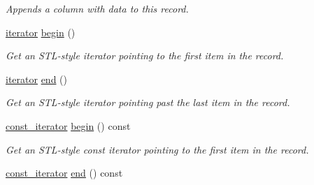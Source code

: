 \begin{DoxyCompactItemize}
\begin{DoxyCompactList}\small\item\em Appends a column with {\itshape data} to this record. \end{DoxyCompactList}\item 
\hyperlink{class_mdt_1_1_plain_text_1_1_record_template_a0785bfc19bfa479d1097dbfcfdd03bef}{iterator} \hyperlink{class_mdt_1_1_plain_text_1_1_record_template_a9dd45947652ce2969f4a8c3b98e852bc}{begin} ()\hypertarget{class_mdt_1_1_plain_text_1_1_record_template_a9dd45947652ce2969f4a8c3b98e852bc}{}\label{class_mdt_1_1_plain_text_1_1_record_template_a9dd45947652ce2969f4a8c3b98e852bc}

\begin{DoxyCompactList}\small\item\em Get an S\+T\+L-\/style iterator pointing to the first item in the record. \end{DoxyCompactList}\item 
\hyperlink{class_mdt_1_1_plain_text_1_1_record_template_a0785bfc19bfa479d1097dbfcfdd03bef}{iterator} \hyperlink{class_mdt_1_1_plain_text_1_1_record_template_af87a170a35d825212480b33c2470f4c2}{end} ()\hypertarget{class_mdt_1_1_plain_text_1_1_record_template_af87a170a35d825212480b33c2470f4c2}{}\label{class_mdt_1_1_plain_text_1_1_record_template_af87a170a35d825212480b33c2470f4c2}

\begin{DoxyCompactList}\small\item\em Get an S\+T\+L-\/style iterator pointing past the last item in the record. \end{DoxyCompactList}\item 
\hyperlink{class_mdt_1_1_plain_text_1_1_record_template_a3c5cf577c8412857077b2a1f9088c1ae}{const\+\_\+iterator} \hyperlink{class_mdt_1_1_plain_text_1_1_record_template_a49e047841c96985dfd966190c29d5a1c}{begin} () const \hypertarget{class_mdt_1_1_plain_text_1_1_record_template_a49e047841c96985dfd966190c29d5a1c}{}\label{class_mdt_1_1_plain_text_1_1_record_template_a49e047841c96985dfd966190c29d5a1c}

\begin{DoxyCompactList}\small\item\em Get an S\+T\+L-\/style const iterator pointing to the first item in the record. \end{DoxyCompactList}\item 
\hyperlink{class_mdt_1_1_plain_text_1_1_record_template_a3c5cf577c8412857077b2a1f9088c1ae}{const\+\_\+iterator} \hyperlink{class_mdt_1_1_plain_text_1_1_record_template_a34815e19f3fa3761438c3d9a7ed85625}{end} () const \hypertarget{class_mdt_1_1_plain_text_1_1_record_template_a34815e19f3fa3761438c3d9a7ed85625}{}\label{class_mdt_1_1_plain_text_1_1_record_template_a34815e19f3fa3761438c3d9a7ed85625}


\end{DoxyCompactItemize}
